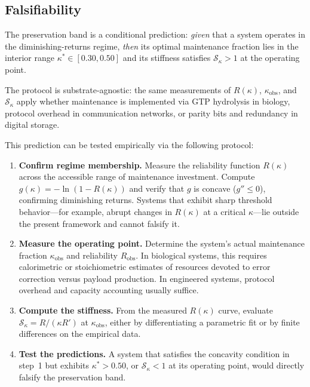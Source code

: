 \documentclass[11pt,twocolumn]{article}
\begin{document}
\subsection{Falsifiability}
\label{sec:falsifiability}

The preservation band is a conditional prediction: \emph{given} that a system operates in the diminishing-returns regime, \emph{then} its optimal maintenance fraction lies in the interior range $\kappa^* \in [0.30, 0.50]$ and its stiffness satisfies $\mathcal{S}_\kappa > 1$ at the operating point.

The protocol is substrate-agnostic: the same measurements of $R(\kappa)$, $\kappa_{\mathrm{obs}}$, and $\mathcal{S}_\kappa$ apply whether maintenance is implemented via GTP hydrolysis in biology, protocol overhead in communication networks, or parity bits and redundancy in digital storage.

This prediction can be tested empirically via the following protocol:
\begin{enumerate}[leftmargin=*,itemsep=2pt]
  \item \textbf{Confirm regime membership.} Measure the reliability function $R(\kappa)$ across the accessible range of maintenance investment. Compute $g(\kappa) = -\ln(1 - R(\kappa))$ and verify that $g$ is concave ($g'' \le 0$), confirming diminishing returns. Systems that exhibit sharp threshold behavior---for example, abrupt changes in $R(\kappa)$ at a critical $\kappa$---lie outside the present framework and cannot falsify it.
  
  \item \textbf{Measure the operating point.} Determine the system's actual maintenance fraction $\kappa_{\mathrm{obs}}$ and reliability $R_{\mathrm{obs}}$. In biological systems, this requires calorimetric or stoichiometric estimates of resources devoted to error correction versus payload production. In engineered systems, protocol overhead and capacity accounting usually suffice.
  
  \item \textbf{Compute the stiffness.} From the measured $R(\kappa)$ curve, evaluate $\mathcal{S}_\kappa = R/(\kappa R')$ at $\kappa_{\mathrm{obs}}$, either by differentiating a parametric fit or by finite differences on the empirical data.
  
  \item \textbf{Test the predictions.} A system that satisfies the concavity condition in step~1 but exhibits $\kappa^* > 0.50$, or $\mathcal{S}_\kappa < 1$ at its operating point, would directly falsify the preservation band.
\end{enumerate}
\end{document}
